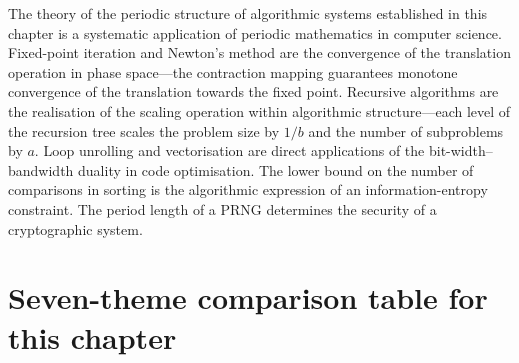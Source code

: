 \begin{remark}\label{rem:algorithm_chapter_unity}
The theory of the periodic structure of algorithmic systems established in this chapter is a systematic application of periodic mathematics in computer science. Fixed-point iteration and Newton's method are the convergence of the translation operation in phase space---the contraction mapping guarantees monotone convergence of the translation towards the fixed point. Recursive algorithms are the realisation of the scaling operation within algorithmic structure---each level of the recursion tree scales the problem size by $1/b$ and the number of subproblems by $a$. Loop unrolling and vectorisation are direct applications of the bit-width--bandwidth duality in code optimisation. The lower bound on the number of comparisons in sorting is the algorithmic expression of an information-entropy constraint. The period length of a PRNG determines the security of a cryptographic system.
\end{remark}

\section*{Seven-theme comparison table for this chapter}

